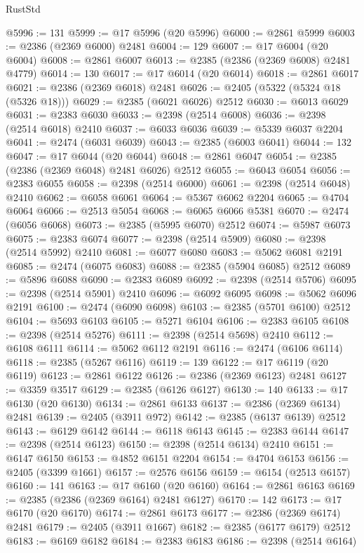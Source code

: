 \begin{lexlean}{RustStd}
\begin{coremodule}
@5996 := 131
@5999 := @17 @5996 (@20 @5996)
@6000 := @2861 @5999
@6003 := @2386 (@2369 @6000) @2481
@6004 := 129
@6007 := @17 @6004 (@20 @6004)
@6008 := @2861 @6007
@6013 := @2385 (@2386 (@2369 @6008) @2481 @4779)
@6014 := 130
@6017 := @17 @6014 (@20 @6014)
@6018 := @2861 @6017
@6021 := @2386 (@2369 @6018) @2481
@6026 := @2405 (@5322 (@5324 @18 (@5326 @18)))
@6029 := @2385 (@6021 @6026) @2512
@6030 := @6013 @6029
@6031 := @2383 @6030
@6033 := @2398 (@2514 @6008)
@6036 := @2398 (@2514 @6018) @2410
@6037 := @6033 @6036
@6039 := @5339 @6037 @2204
@6041 := @2474 (@6031 @6039)
@6043 := @2385 (@6003 @6041)
@6044 := 132
@6047 := @17 @6044 (@20 @6044)
@6048 := @2861 @6047
@6054 := @2385 (@2386 (@2369 @6048) @2481 @6026) @2512
@6055 := @6043 @6054
@6056 := @2383 @6055
@6058 := @2398 (@2514 @6000)
@6061 := @2398 (@2514 @6048) @2410
@6062 := @6058 @6061
@6064 := @5367 @6062 @2204
@6065 := @4704 @6064
@6066 := @2513 @5054
@6068 := @6065 @6066 @5381
@6070 := @2474 (@6056 @6068)
@6073 := @2385 (@5995 @6070) @2512
@6074 := @5987 @6073
@6075 := @2383 @6074
@6077 := @2398 (@2514 @5909)
@6080 := @2398 (@2514 @5992) @2410
@6081 := @6077 @6080
@6083 := @5062 @6081 @2191
@6085 := @2474 (@6075 @6083)
@6088 := @2385 (@5904 @6085) @2512
@6089 := @5896 @6088
@6090 := @2383 @6089
@6092 := @2398 (@2514 @5706)
@6095 := @2398 (@2514 @5901) @2410
@6096 := @6092 @6095
@6098 := @5062 @6096 @2191
@6100 := @2474 (@6090 @6098)
@6103 := @2385 (@5701 @6100) @2512
@6104 := @5693 @6103
@6105 := @5271 @6104
@6106 := @2383 @6105
@6108 := @2398 (@2514 @5276)
@6111 := @2398 (@2514 @5698) @2410
@6112 := @6108 @6111
@6114 := @5062 @6112 @2191
@6116 := @2474 (@6106 @6114)
@6118 := @2385 (@5267 @6116)
@6119 := 139
@6122 := @17 @6119 (@20 @6119)
@6123 := @2861 @6122
@6126 := @2386 (@2369 @6123) @2481
@6127 := @3359 @3517
@6129 := @2385 (@6126 @6127)
@6130 := 140
@6133 := @17 @6130 (@20 @6130)
@6134 := @2861 @6133
@6137 := @2386 (@2369 @6134) @2481
@6139 := @2405 (@3911 @972)
@6142 := @2385 (@6137 @6139) @2512
@6143 := @6129 @6142
@6144 := @6118 @6143
@6145 := @2383 @6144
@6147 := @2398 (@2514 @6123)
@6150 := @2398 (@2514 @6134) @2410
@6151 := @6147 @6150
@6153 := @4852 @6151 @2204
@6154 := @4704 @6153
@6156 := @2405 (@3399 @1661)
@6157 := @2576 @6156
@6159 := @6154 (@2513 @6157)
@6160 := 141
@6163 := @17 @6160 (@20 @6160)
@6164 := @2861 @6163
@6169 := @2385 (@2386 (@2369 @6164) @2481 @6127)
@6170 := 142
@6173 := @17 @6170 (@20 @6170)
@6174 := @2861 @6173
@6177 := @2386 (@2369 @6174) @2481
@6179 := @2405 (@3911 @1667)
@6182 := @2385 (@6177 @6179) @2512
@6183 := @6169 @6182
@6184 := @2383 @6183
@6186 := @2398 (@2514 @6164)

\end{coremodule}
\end{lexlean}
